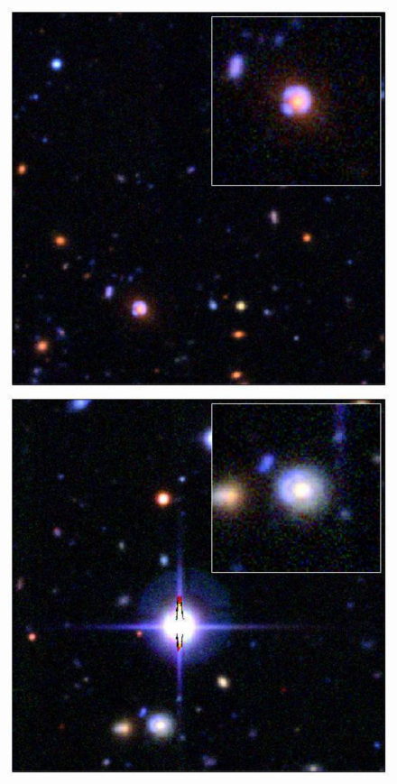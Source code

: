 \documentclass[useAMS,usenatbib,a4paper]{mn2e}
\begin{document}
\begin{figure}%
\begin{minipage}[b]{0.24\linewidth}
\centering\includegraphics[width=\linewidth]{4.pdf}
\end{minipage} \hfill
\begin{minipage}[b]{0.24\linewidth}
\centering\includegraphics[width=\linewidth]{5.pdf}

\end{minipage}
\end{figure}
\end{document}

